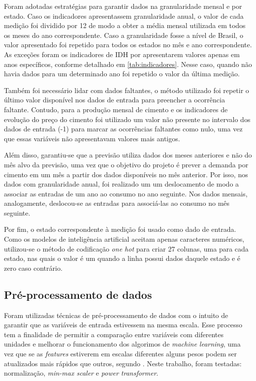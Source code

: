 Foram adotadas estratégias para garantir dados na granularidade
mensal e por estado. Caso os indicadores apresentassem granularidade anual, o valor de
cada medição foi dividido por 12 de modo a obter a média mensal utilizada em 
todos os meses do ano correspondente. Caso a granularidade
fosse a nível de Brasil, o valor apresentado foi repetido para todos os 
estados no mês e ano correspondente. As exceções foram os 
indicadores de IDH por apresentarem valores apenas em anos específicos, conforme 
detalhado em \ref{tab:indicadores}. Nesse caso, quando não havia dados para um 
determinado ano foi repetido o valor da última medição.

Também foi necessário lidar com dados faltantes, o método utilizado foi
repetir o último valor disponível nos dados de entrada para
preencher a ocorrência faltante. Contudo, para a produção mensal de cimento e os 
indicadores de evolução do preço do cimento foi utilizado um valor não 
presente no intervalo dos dados de entrada (-1) para marcar as ocorrências 
faltantes como nulo, uma vez que essas variáveis não apresentavam 
valores mais antigos.

Além disso, garantiu-se que a previsão
 utiliza dados dos meses anteriores e não do mês alvo da
previsão, uma vez que o objetivo do projeto é prever a demanda
por cimento em um mês a partir dos dados disponíveis no mês anterior.
Por isso, nos dados com granularidade anual, foi realizado um um 
deslocamento de modo a associar as entradas de um ano ao consumo no 
ano seguinte. Nos dados mensais, analogamente, deslocou-se as entradas 
para associá-las ao consumo no mês seguinte.

Por fim, o estado correspondente à medição foi usado como dado de entrada. 
Como os modelos de inteligência artificial aceitam apenas caracteres numéricos,
utilizou-se o método de codificação \textit{one hot} para criar 27 colunas, uma
para cada estado, nas quais o valor é um quando a linha possui dados daquele estado 
e é zero caso contrário.


\subsection{Pré-processamento de dados}
\label{sec:norm_dados}

Foram utilizadas técnicas de pré-processamento de dados 
com o intuito de garantir que as variáveis de entrada 
estivessem na mesma escala. Esse processo tem a finalidade de permitir a comparação 
entre variáveis com diferentes unidades e melhorar o funcionamento dos 
algorimos de \textit{machine learning}, uma vez que se as \textit{features} estiverem em escalas diferentes
alguns pesos podem ser atualizados mais rápidos que outros, segundo \citet{Raschka}.
Neste trabalho, foram testadas: normalização, 
\textit{min-max scaler} e \textit{power transformer}.

